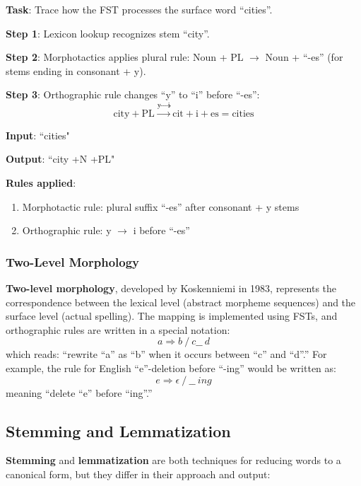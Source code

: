 \documentclass[11pt,a4paper]{article}
\begin{document}
\begin{tcolorbox}[colback=green!5!white,colframe=green!75!black,title=\textbf{Worked Example: FST Morphological Parsing}]
\textbf{Task}: Trace how the FST processes the surface word ``cities''.

\textbf{Step 1}: Lexicon lookup recognizes stem ``city''.

\textbf{Step 2}: Morphotactics applies plural rule: Noun + PL $\to$ Noun + ``-es'' (for stems ending in consonant + y).

\textbf{Step 3}: Orthographic rule changes ``y'' to ``i'' before ``-es'':
\[
\text{city} + \text{PL} \xrightarrow{\text{y} \to \text{i}} \text{cit} + \text{i} + \text{es} = \text{cities}
\]

\textbf{Input}: ``cities"

\textbf{Output}: ``city +N +PL"

\textbf{Rules applied}:
\begin{enumerate}
    \item Morphotactic rule: plural suffix ``-es'' after consonant + y stems
    \item Orthographic rule: y $\to$ i before ``-es''
\end{enumerate}
\end{tcolorbox}

\subsubsection{Two-Level Morphology}

\textbf{Two-level morphology}, developed by Koskenniemi in 1983, represents the correspondence between the lexical level (abstract morpheme sequences) and the surface level (actual spelling). The mapping is implemented using FSTs, and orthographic rules are written in a special notation:
\[
a \Rightarrow b \ / \ c \_\_ \ d
\]
which reads: ``rewrite ``a'' as ``b'' when it occurs between ``c'' and ``d''.'' For example, the rule for English ``e''-deletion before ``-ing'' would be written as:
\[
e \Rightarrow \epsilon \ / \ \_\_ \ ing
\]
meaning ``delete ``e'' before ``ing''.''

\subsection{Stemming and Lemmatization}

\textbf{Stemming} and \textbf{lemmatization} are both techniques for reducing words to a canonical form, but they differ in their approach and output:
\end{document}
